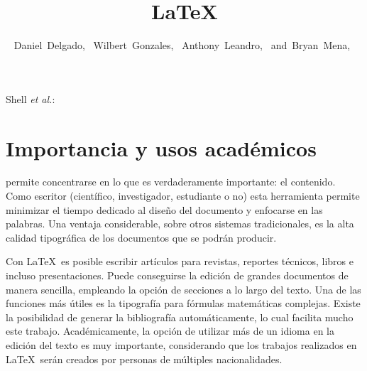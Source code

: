 \documentclass[10pt,journal,compsoc]{IEEEtran}
\begin{document}
\title{\LaTeX}

\author{Daniel~Delgado,~
        Wilbert~Gonzales,~
        Anthony~Leandro,~
        and~Bryan~Mena,~
}
{Shell \MakeLowercase{\textit{et al.}}: \LaTex}

\maketitle

\IEEEdisplaynontitleabstractindextext

\IEEEpeerreviewmaketitle

\section{Importancia y usos acad\'emicos}
 permite concentrarse en lo que es verdaderamente importante: el contenido. Como escritor (cient\'ifico, investigador,  estudiante o no) esta herramienta permite minimizar el tiempo dedicado al diseño del documento y enfocarse en las palabras. Una ventaja considerable, sobre otros sistemas tradicionales, es la alta calidad tipogr\'afica de los documentos que se podr\'an producir.

Con \LaTeX\ es posible escribir art\'iculos para revistas, reportes t\'ecnicos, libros e incluso presentaciones. Puede conseguirse la edici\'on de grandes documentos de manera sencilla, empleando la opci\'on de secciones a lo largo del texto. Una de las funciones m\'as \'utiles es la tipograf\'ia para f\'ormulas matem\'aticas complejas. Existe la posibilidad de generar la bibliograf\'ia autom\'aticamente, lo cual facilita mucho este trabajo. Acad\'emicamente, la opci\'on de utilizar m\'as de un idioma en la edici\'on del texto es muy importante, considerando que los trabajos realizados en \LaTeX\ ser\'an creados por personas de m\'ultiples nacionalidades.
\end{document}
